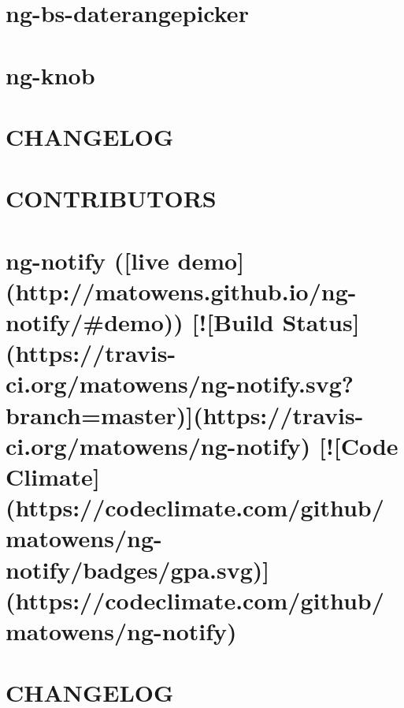 \documentclass[twoside]{book}
\newcommand{\+}{\discretionary{\mbox{\scriptsize$\hookleftarrow$}}{}{}}
\begin{document}
\chapter{ng-\/bs-\/daterangepicker}
\label{md_app_web_bower_components_ng-bs-daterangepicker__r_e_a_d_m_e}

\chapter{ng-\/knob}
\label{md_app_web_bower_components_ng-knob__r_e_a_d_m_e}

\chapter{C\+H\+A\+N\+G\+E\+L\+OG}
\label{md_app_web_bower_components_ng-notify__c_h_a_n_g_e_l_o_g}

\chapter{C\+O\+N\+T\+R\+I\+B\+U\+T\+O\+RS}
\label{md_app_web_bower_components_ng-notify__c_o_n_t_r_i_b_u_t_o_r_s}

\chapter{ng-\/notify (\mbox{[}live demo\mbox{]}(http\+://matowens.github.\+io/ng-\/notify/\#demo)) \mbox{[}!\mbox{[}Build Status\mbox{]}(https\+://travis-\/ci.org/matowens/ng-\/notify.svg?branch=master)\mbox{]}(https\+://travis-\/ci.org/matowens/ng-\/notify) \mbox{[}!\mbox{[}Code Climate\mbox{]}(https\+://codeclimate.com/github/matowens/ng-\/notify/badges/gpa.svg)\mbox{]}(https\+://codeclimate.com/github/matowens/ng-\/notify)}
\label{md_app_web_bower_components_ng-notify__r_e_a_d_m_e}

\chapter{C\+H\+A\+N\+G\+E\+L\+OG}
\label{md_app_web_bower_components_ng-table__c_h_a_n_g_e_l_o_g}

\end{document}
